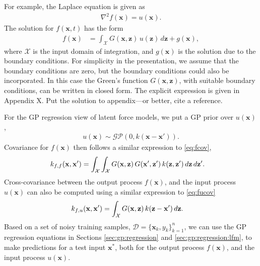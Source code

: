 \documentclass[journal]{IEEEtran}
\newcommand{\simo}[1]{{\color{red}#1}}
\begin{document}
For example, the Laplace equation is given as
\begin{align*}
  \nabla^2 f(\mathbf{x}) = u(\mathbf{x}).
\end{align*}
%
The solution for $f(\mathbf{x},t)$ has the form
\begin{align*}
f(\mathbf{x}) & = \int_{\mathcal{X}} G(\mathbf{x}, \mathbf{z})\,
                u(\mathbf{z})\,d\mathbf{z} + g(\mathbf{x}),
\end{align*}
%
where $\mathcal{X}$ is the input domain of integration, and $g(\mathbf{x})$ is the solution due to the boundary
conditions. For simplicity in the presentation, we assume that the boundary conditions are zero, but the boundary conditions could also be incorporated. In this case the Green's function $G(\mathbf{x}, \mathbf{z})$, with suitable boundary conditions, can be written in closed form. The explicit expression is given in Appendix X. \simo{Put the solution to appendix---or better, cite a reference.}

For the GP regression view of latent force models, we put a GP prior over $u(\mathbf{x})$,
\begin{align*}
u(\mathbf{x})\sim\mathcal{GP}(0, k(\mathbf{x} - \mathbf{x}')).
\end{align*}
Covariance for $f(\mathbf{x})$ then follows a similar expression to \eqref{eq:fcov},
\begin{equation}
\begin{split}
  k_{f,f}(\mathbf{x}, \mathbf{x}') &=
  \int_{\mathcal{X}}   \int_{\mathcal{X}}
  G(\mathbf{x}, \mathbf{z}) \, G(\mathbf{x}', \mathbf{z}') \, k(\mathbf{z}, \mathbf{z}') \, d\mathbf{z} \, d\mathbf{z}'.
\end{split}
\notag
\end{equation}
Cross-covariance between the output process $f(\mathbf{x})$, and the input process $u(\mathbf{x})$ can also be computed
using a similar expression to \eqref{eq:fucov}
\begin{align}
k_{f,u}(\mathbf{x},\mathbf{x}') & = \int_{\mathcal{X}} G(\mathbf{x}, \mathbf{z})\, k(\mathbf{z} - \mathbf{x}')\, d\mathbf{z}.
\notag
\end{align}
Based on a set of noisy training samples, $\mathcal{D}=\{\mathbf{x}_k, y_k\}_{k=1}^n$, we can
use the GP regression equations in Sections \ref{sec:gp:regression} and \ref{sec:gp:regression:lfm}, to make predictions
for a test input $\mathbf{x}^*$, both for the output process $f(\mathbf{x})$, and the input process $u(\mathbf{x})$.
\end{document}
